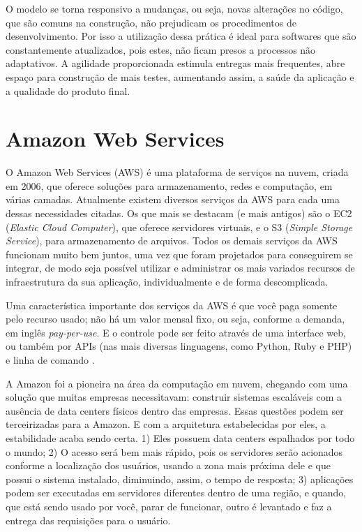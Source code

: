 O modelo se torna responsivo a mudanças, ou seja, novas alterações no código, que são comuns na construção, não prejudicam os procedimentos de desenvolvimento. Por isso a utilização dessa prática é ideal para softwares que são constantemente atualizados, pois estes, não ficam presos a processos não adaptativos. A agilidade proporcionada estimula entregas mais frequentes, abre espaço para construção de mais testes, aumentando assim, a saúde da aplicação e a qualidade do produto final.

\section{Amazon Web Services}

O Amazon Web Services (AWS) é uma plataforma de serviços na nuvem, criada em 2006, que oferece soluções para armazenamento, redes e computação, em várias camadas. Atualmente existem diversos serviços da AWS para cada uma dessas necessidades citadas. Os que mais se destacam (e mais antigos) são o EC2 (\textit{Elastic Cloud Computer}), que oferece servidores virtuais, e o S3 (\textit{Simple Storage Service}), para armazenamento de arquivos. Todos os demais serviços da AWS funcionam muito bem juntos, uma vez que foram projetados para conseguirem se integrar, de modo seja possível utilizar e administrar os mais variados recursos de infraestrutura da sua aplicação, individualmente e de forma descomplicada.

Uma característica importante dos serviços da AWS é que você paga somente pelo recurso usado; não há um valor mensal fixo, ou seja, conforme a demanda, em inglês \textit{pay-per-use}. E o controle pode ser feito através de uma interface web, ou também por APIs (nas mais diversas linguagens, como Python, Ruby e PHP) e linha de comando .

A Amazon foi a pioneira na área da computação em nuvem, chegando com uma solução que muitas empresas necessitavam: construir sistemas escaláveis com a ausência de data centers físicos dentro das empresas. Essas questões podem ser terceirizadas para a Amazon. E com a arquitetura estabelecidas por eles, a estabilidade acaba sendo certa. 1) Eles possuem data centers espalhados por todo o mundo; 2) O acesso será bem mais rápido, pois os servidores serão acionados conforme a localização dos usuários, usando a zona mais próxima dele e que possui o sistema instalado, diminuindo, assim, o tempo de resposta; 3) aplicações podem ser executadas em servidores diferentes dentro de uma região, e quando, que está sendo usado por você, parar de funcionar, outro é levantado e faz a entrega das requisições para o usuário.

